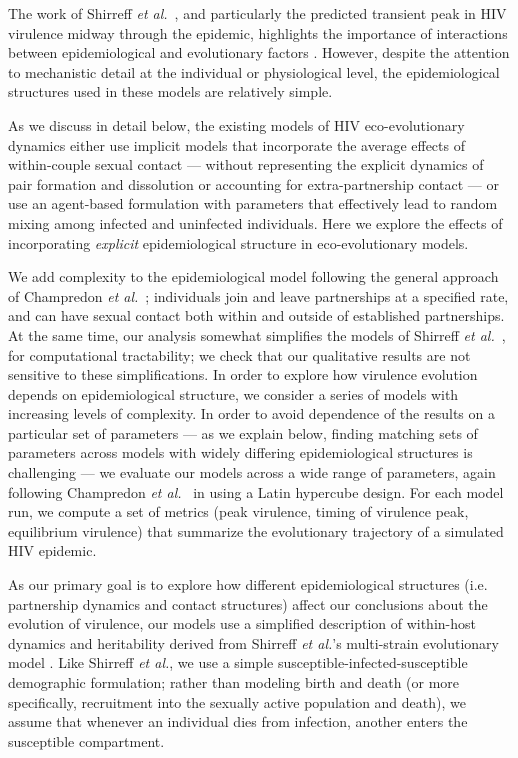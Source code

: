 \documentclass[10pt,letterpaper]{article}
\newcommand{\etal}{\textit{et al.}}
\begin{document}
The work of Shirreff \etal\ \cite{shirreff_transmission_2011}, and particularly the predicted
transient peak in HIV virulence midway through the epidemic,
highlights the importance of interactions between epidemiological and
evolutionary factors \cite{day_virulence_2004,alizon_price_2009}.
However, despite the attention to mechanistic detail at the individual
or physiological level, the epidemiological structures used in these
models are relatively simple.

As we discuss in detail below, the
existing models of HIV eco-evolutionary dynamics either use implicit
models that incorporate the average effects of within-couple sexual
contact --- without representing the explicit dynamics of pair
formation and dissolution or accounting for extra-partnership contact
--- or use an agent-based formulation with parameters that effectively
lead to random mixing among infected and uninfected individuals. Here
we explore the effects of incorporating \emph{explicit}
epidemiological structure in eco-evolutionary models.

We add complexity to the epidemiological model following the general approach of Champredon \etal\ \cite{champredon_hiv_2013}; individuals join and leave partnerships at a specified rate, and can have sexual contact both within and outside of established partnerships. At the same time, our analysis somewhat simplifies the models of Shirreff \etal\ \cite{shirreff_transmission_2011}, for computational tractability; we check that our qualitative results are not sensitive to these simplifications. In order to explore how virulence evolution depends on epidemiological structure, we consider a series of models with increasing levels of complexity. In order to avoid dependence of the results on a particular set of parameters --- as we explain below, finding matching sets of parameters across models with widely differing epidemiological structures is challenging --- we evaluate our models across a wide range of parameters, again following Champredon \etal\ \cite{champredon_hiv_2013} in using a Latin hypercube design. For each model run, we compute a set of metrics (peak virulence, timing of virulence peak, equilibrium virulence) that summarize the evolutionary trajectory of a simulated HIV epidemic.

As our primary goal is to explore how different epidemiological structures (i.e. partnership dynamics and contact structures) affect our conclusions about the evolution of virulence, our models use a simplified description of within-host dynamics and heritability derived from 
Shirreff \etal's multi-strain evolutionary model \cite{shirreff_transmission_2011}. Like Shirreff \etal, we use a simple susceptible-infected-susceptible demographic formulation; rather than modeling birth and death (or more specifically, recruitment into the sexually active population and death), we assume that whenever an individual dies from infection, another enters the susceptible compartment.
\end{document}
